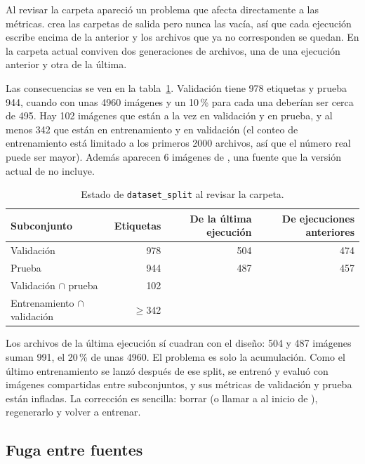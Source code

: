 \documentclass[11pt,a4paper]{article}
\begin{document}
Al revisar la carpeta  apareció un problema que afecta directamente a las métricas.  crea las carpetas de salida pero nunca las vacía, así que cada ejecución escribe encima de la anterior y los archivos que ya no corresponden se quedan. En la carpeta actual conviven dos generaciones de archivos, una de una ejecución anterior y otra de la última.

Las consecuencias se ven en la tabla~\ref{tab:residuos}. Validación tiene 978 etiquetas y prueba 944, cuando con unas 4960 imágenes y un 10\,\% para cada una deberían ser cerca de 495. Hay 102 imágenes que están a la vez en validación y en prueba, y al menos 342 que están en entrenamiento y en validación (el conteo de entrenamiento está limitado a los primeros 2000 archivos, así que el número real puede ser mayor). Además aparecen 6 imágenes de , una fuente que la versión actual de  no incluye.

\begin{table}[H]
\centering
\caption{Estado de \texorpdfstring{\texttt{dataset\_split}}{dataset\_split} al revisar la carpeta.}
\label{tab:residuos}
\begin{tabular}{lrrr}
\toprule
Subconjunto & Etiquetas & De la última ejecución & De ejecuciones anteriores \\
\midrule
Validación & 978 & 504 & 474 \\
Prueba & 944 & 487 & 457 \\
\midrule
Validación $\cap$ prueba & 102 & & \\
Entrenamiento $\cap$ validación & $\ge$342 & & \\
\bottomrule
\end{tabular}
\end{table}

Los archivos de la última ejecución sí cuadran con el diseño: 504 y 487 imágenes suman 991, el 20\,\% de unas 4960. El problema es solo la acumulación. Como el último entrenamiento se lanzó después de ese split, se entrenó y evaluó con imágenes compartidas entre subconjuntos, y sus métricas de validación y prueba están infladas. La corrección es sencilla: borrar  (o llamar a  al inicio de ), regenerarlo y volver a entrenar.

\subsection{Fuga entre fuentes}
\end{document}
